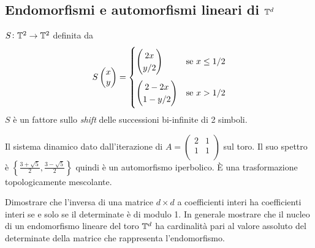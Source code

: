 \subsection{Endomorfismi e automorfismi lineari di $ \mathbb{T}^d $}
\begin{example}
    $ S \colon \mathbb{T}^2 \to \mathbb{T}^2 $ definita da 
    \begin{equation*}
        S 
        \begin{pmatrix}
            x \\
            y 
        \end{pmatrix}
        = 
        \begin{cases}
            \begin{pmatrix}
                2x \\
                y/2 
            \end{pmatrix} 
            & \text{se $ x \leq 1/2 $} \\[1.5em]
            \begin{pmatrix}
                2 - 2x \\
                1 - y/2 
            \end{pmatrix}
            & \text{se $ x > 1/2 $}
        \end{cases}
    \end{equation*}
    $ S $ è un fattore sullo \emph{shift} delle successioni bi-infinite di 2 simboli. 
\end{example}

\begin{example} 
    Il sistema dinamico dato dall'iterazione di $ A = \begin{pmatrix} 2 & 1 \\ 1 & 1 \\\end{pmatrix} $ sul toro. Il suo spettro è $     \left\{\frac{3+\sqrt{5}}{2}, \frac{3-\sqrt{5}}{2}\right\} $ quindi è un automorfismo iperbolico. È una trasformazione topologicamente mescolante. 
\end{example}

\begin{exercise}
    Dimostrare che l’inversa di una matrice $ d \times d $ a coefficienti interi ha coefficienti interi se e solo se il determinate è di modulo 1. In generale mostrare che il nucleo di un endomorfismo lineare del toro $ \mathbb{T}^d $ ha cardinalità pari al valore assoluto del determinate della matrice che rappresenta l'endomorfismo.    
\end{exercise}

